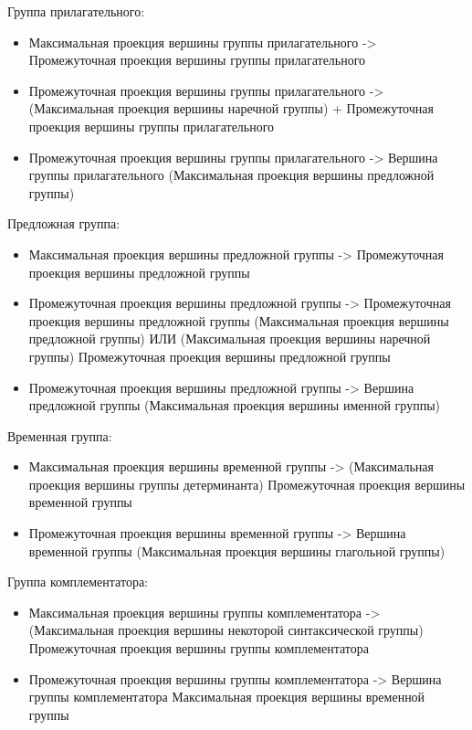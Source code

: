 Группа прилагательного:
\begin{itemize}
    \item Максимальная проекция вершины группы прилагательного -> Промежуточная проекция вершины группы прилагательного
    \item Промежуточная проекция вершины группы прилагательного -> (Максимальная проекция вершины наречной группы) + Промежуточная проекция вершины группы прилагательного
    \item Промежуточная проекция вершины группы прилагательного -> Вершина группы прилагательного (Максимальная проекция вершины предложной группы)
\end{itemize}

Предложная группа:
\begin{itemize}
    \item Максимальная проекция вершины предложной группы -> Промежуточная проекция вершины предложной группы
    \item Промежуточная проекция вершины предложной группы -> Промежуточная проекция вершины предложной группы (Максимальная проекция вершины предложной группы) ИЛИ (Максимальная проекция вершины наречной группы) Промежуточная проекция вершины предложной группы
    \item Промежуточная проекция вершины предложной группы -> Вершина предложной группы (Максимальная проекция вершины именной группы)
\end{itemize}

Временная группа:
\begin{itemize}
    \item Максимальная проекция вершины временной группы -> (Максимальная проекция вершины группы детерминанта) Промежуточная проекция вершины временной группы
    \item Промежуточная проекция вершины временной группы -> Вершина временной группы (Максимальная проекция вершины глагольной группы)
\end{itemize}

Группа комплементатора:
\begin{itemize}
    \item Максимальная проекция вершины группы комплементатора -> (Максимальная проекция вершины некоторой синтаксической группы) Промежуточная проекция вершины группы комплементатора
    \item Промежуточная проекция вершины группы комплементатора -> Вершина группы комплементатора Максимальная проекция вершины временной группы
\end{itemize}

